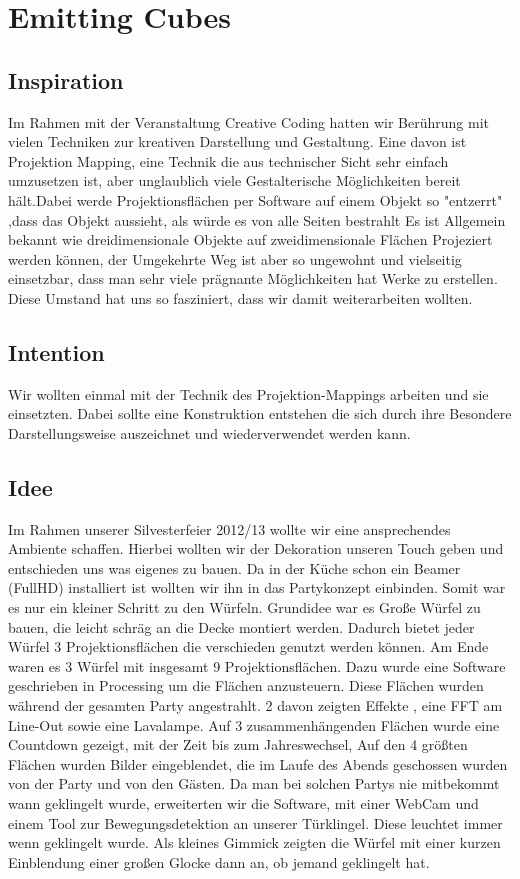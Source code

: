 \documentclass[pdftex,12pt,a4paper]{report}
\begin{document}
\tableofcontents
\newpage

\chapter{Emitting Cubes }
\section{Inspiration}
Im Rahmen mit der Veranstaltung Creative Coding hatten wir Berührung mit vielen Techniken zur kreativen Darstellung und Gestaltung. Eine davon ist Projektion Mapping, eine Technik die aus technischer Sicht sehr einfach umzusetzen ist, aber unglaublich viele Gestalterische Möglichkeiten bereit hält.Dabei werde Projektionsflächen per Software auf einem Objekt so "entzerrt" ,dass das Objekt  aussieht, als würde es von alle Seiten bestrahlt Es ist Allgemein bekannt wie dreidimensionale Objekte  auf zweidimensionale Flächen Projeziert werden können, der Umgekehrte Weg ist aber so ungewohnt und vielseitig einsetzbar, dass man sehr viele prägnante Möglichkeiten hat Werke zu erstellen. Diese Umstand hat uns so fasziniert, dass wir damit weiterarbeiten wollten. 

\section{Intention}
Wir wollten einmal mit der Technik des Projektion-Mappings arbeiten und sie einsetzten. Dabei sollte eine Konstruktion entstehen die sich durch ihre Besondere Darstellungsweise auszeichnet und wiederverwendet werden kann.

\section{Idee}
Im Rahmen unserer Silvesterfeier 2012/13 wollte wir eine ansprechendes Ambiente schaffen. Hierbei wollten wir der Dekoration unseren Touch geben und entschieden uns was eigenes zu bauen. Da in der Küche schon ein Beamer (FullHD) installiert ist wollten wir ihn in das Partykonzept einbinden. Somit war es nur ein kleiner Schritt zu den Würfeln. Grundidee war es Große Würfel zu bauen, die leicht schräg an die Decke montiert werden. Dadurch bietet jeder Würfel 3 Projektionsflächen die verschieden genutzt werden können. Am Ende waren es 3 Würfel mit insgesamt 9 Projektionsflächen. Dazu wurde eine Software geschrieben in Processing um die Flächen anzusteuern. Diese Flächen wurden während der gesamten Party angestrahlt. 2 davon zeigten Effekte , eine FFT am Line-Out sowie eine Lavalampe. Auf 3 zusammenhängenden Flächen wurde eine Countdown gezeigt, mit der Zeit bis zum Jahreswechsel, Auf den 4 größten Flächen wurden Bilder eingeblendet, die im Laufe des Abends geschossen wurden von der Party und von den Gästen. Da man bei solchen Partys nie mitbekommt wann geklingelt wurde, erweiterten wir die Software, mit einer WebCam und einem Tool zur Bewegungsdetektion an unserer Türklingel. Diese leuchtet immer wenn geklingelt wurde.  Als kleines Gimmick zeigten die Würfel mit einer kurzen Einblendung einer großen Glocke dann an, ob jemand geklingelt hat.
\end{document}
